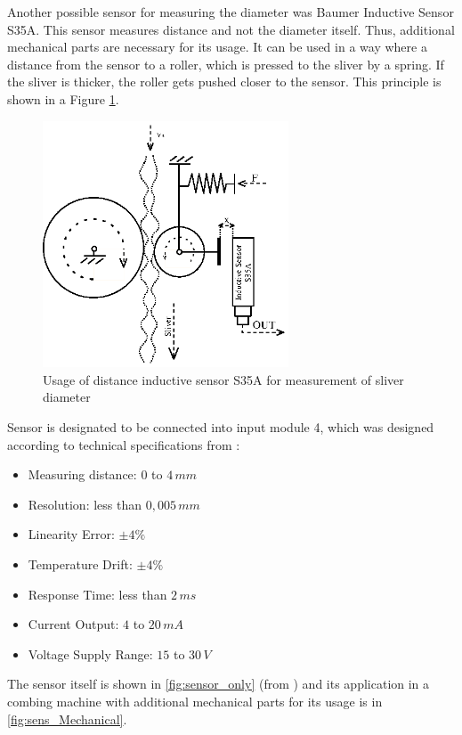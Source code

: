 \documentclass[twoside]{ctuthesis}
\theoremstyle{plain}
\theoremstyle{definition}
\theoremstyle{note}
\begin{document}
Another possible sensor for measuring the diameter was Baumer Inductive Sensor S35A. This sensor measures distance and not the diameter itself. Thus, additional mechanical parts are necessary for its usage. It can be used in a way where a distance from the sensor to a roller, which is pressed to the sliver by a spring. If the sliver is thicker, the roller gets pushed closer to the sensor. This principle is shown in a Figure \ref{fig:inductiveSensorDiagram}.
\begin{figure}[h]
	\centering
	\includegraphics[width=0.65\textwidth]{SensorDiagram.eps}
	\caption{Usage of distance inductive sensor S35A for measurement of sliver diameter}
	\label{fig:inductiveSensorDiagram}
\end{figure}
Sensor is designated to be connected into input module 4, which was designed according to technical specifications from \cite{cite:InductiveSensor}:
\begin{itemize}
	\setlength{\itemsep}{5pt}
	\item Measuring distance: $0$ to $4\,mm$
	\item Resolution: less than $0,005\,mm$
	\item Linearity Error: $\pm4\%$
	\item Temperature Drift: $\pm4\%$
	\item Response Time: less than $2\,ms$
	\item Current Output: $4$ to $20\,mA$
	\item Voltage Supply Range: $15$ to $30\,V$    
\end{itemize}
The sensor itself is shown in \ref{fig:sensor_only} (from \cite{cite:InductiveSensor}) and its application in a combing machine with additional mechanical parts for its usage is in \ref{fig:sens_Mechanical}.
\end{document}
